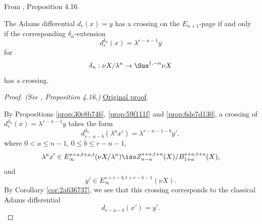 \begin{proposition}
\label{paper:4.16}
From \cite{LWX126}, Proposition 4.16.\par
\label{prop:cross-dr-En}
    The Adams differential $d_r(x)=y$ has a crossing on the $E_{n+1}$-page if and only if the corresponding $\delta_n$-extension
    $$d^{\delta_n}_r(x)=\lambda^{r-n-1}y$$
    for
    $$\delta_{n}:\nu X/\lambda^{n}\to \Sus^{1,-n}\nu X$$
    has a crossing.




\end{proposition}
\begin{proof}
\textit{(See \cite{LWX126}, Proposition 4.16.)} \href{paper/main.tex.html#L1225}{Original proof}.

By Propositions \ref{prop:30e8b746}, \ref{prop:59f111f} and \ref{prop:6de7d130}, a crossing of $d^{\delta_n}_r(x)=\lambda^{r-n-1}y$ takes the form
    $$d^{\delta_n}_{r-a-b}(\lambda^a x')=\lambda^{r-n-1-b}y',$$
    where $0<a\le n-1$, $0\le b\le r-n-1$,
    $$\lambda^a x'\in E_\infty^{s+a,t+a,t}(\nu X/\lambda^n)\iso Z_{n-a}^{s+a,t+a}(X)/B_{1+a}^{s+a,t+a}(X),$$
    and
    $$y'\in E_\infty^{s+r-b, t+r-b-1}(\nu X).$$
    By Corollary \ref{cor:2a636737}, we see that this crossing corresponds to the classical Adams differential
    $$d_{r-a-b}(x')=y'.$$
\end{proof}

